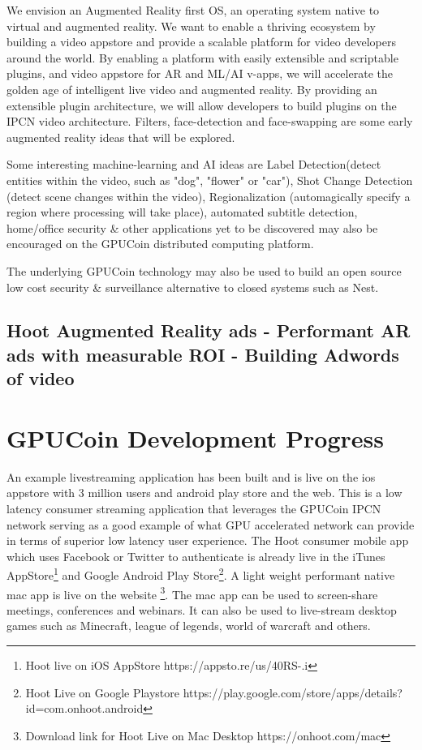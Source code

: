 \documentclass{article}
\begin{document}
We envision an Augmented Reality first OS, an operating system native to virtual and augmented reality. We want to enable a thriving ecosystem by building a video appstore and provide a scalable platform for video developers around the world. By enabling a platform with easily extensible and scriptable plugins, and video appstore for AR and ML/AI v-apps, we will accelerate the golden age of intelligent live video and augmented reality. By providing an extensible plugin architecture, we will allow developers to build plugins on the IPCN video architecture. Filters, face-detection and face-swapping are some early augmented reality ideas that will be explored.

Some interesting machine-learning and AI ideas are Label Detection(detect entities within the video, such as "dog", "flower" or "car"), Shot Change Detection (detect scene changes within the video), Regionalization (automagically specify a region where processing will take place), automated subtitle detection, home/office security \& other applications yet to be discovered may also be encouraged on the GPUCoin distributed computing platform.

The underlying GPUCoin technology may also be used to build an open source low cost security \& surveillance alternative to closed systems such as Nest.
\subsection{Hoot Augmented Reality ads - Performant AR ads with measurable ROI - Building Adwords of video }





\section{GPUCoin Development Progress}

An example livestreaming application has been built and is live on the ios appstore with 3 million users and android play store and the web. This is a low latency consumer streaming application that leverages the GPUCoin IPCN network serving as a good example of what GPU accelerated network can provide in terms of superior low latency user experience.
The Hoot consumer mobile app which uses Facebook or Twitter to authenticate is already live in the iTunes AppStore\footnote{Hoot live on iOS AppStore https://appsto.re/us/40RS-.i} and Google Android Play Store\footnote{Hoot Live on Google Playstore https://play.google.com/store/apps/details?id=com.onhoot.android}.
A light weight performant native mac app is live on
the website \footnote{Download link for Hoot Live on Mac Desktop https://onhoot.com/mac}. The mac app can be used to screen-share meetings, conferences and webinars. It can also be used to live-stream desktop games such as Minecraft, league of legends, world of warcraft and others.
\end{document}
